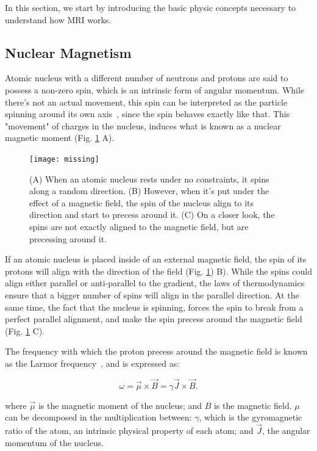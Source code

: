 In this section, we start by introducing the basic physic concepts necessary to
understand how MRI works.

\subsection{Nuclear Magnetism}

Atomic nucleus with a different number of
neutrons and protons are said to possess a non-zero spin, which is an intrinsic
form of angular momentum. While there's not an actual movement, this spin can be
interpreted as the particle spinning around its own axis~\cite{SEGALA1993},
since the spin behaves exactly like that. This "movement" of charges in the nucleus,
induces what is known as a nuclear magnetic moment (Fig. \ref{fig:spin} A).

\begin{figure}[h]
    \texttt{[image: missing]}
    \caption{(A) When an atomic nucleus rests under no constraints, it spins along a
             random direction. (B) However, when it's put under the effect of a
             magnetic field, the spin of the nucleus align to its direction and
             start to precess around it. (C) On a closer look, the spins are
             not exactly aligned to the magnetic field, but are precessing around
             it.}
    \label{fig:spin}
\end{figure} 

If an atomic nucleus is placed inside of an external magnetic field, the spin
of its protons will align with the direction of the field (Fig. \ref{fig:spin}) B).
While the spins could align either parallel or anti-parallel to the gradient,
the laws of thermodynamics ensure that a bigger number of spins will align
in the parallel direction. At the same time, the fact that the nucleus is spinning,
forces the spin to break from a perfect parallel alignment, and make the spin
precess around the magnetic field (Fig. \ref{fig:spin} C).

The frequency with which the proton precess around the magnetic field is known 
as the Larmor frequency~\cite{Larmor1897}, and is expressed as:

\begin{equation}
    \label{eq:larmor}
    \omega = \vec{\mu} \times \vec{B} = \gamma \vec{J} \times \vec{B}.
\end{equation}

where $\vec{\mu}$ is the magnetic moment of the nucleus; and $B$ is the
magnetic field. $\mu$ can be decomposed in the multiplication between:
$\gamma$, which is the gyromagnetic ratio of the atom, an intrinsic physical
property of each atom; and $\vec{J}$, the angular momentum of the nucleus.

